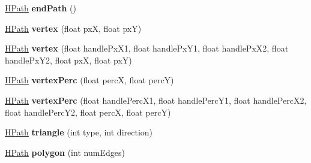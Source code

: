 \begin{DoxyCompactItemize}
\item 
\hypertarget{classhype_1_1extended_1_1drawable_1_1_h_path_a7fab443b9c46241fe59fd7e2756b6bef}{\hyperlink{classhype_1_1extended_1_1drawable_1_1_h_path}{H\-Path} {\bfseries end\-Path} ()}\label{classhype_1_1extended_1_1drawable_1_1_h_path_a7fab443b9c46241fe59fd7e2756b6bef}

\item 
\hypertarget{classhype_1_1extended_1_1drawable_1_1_h_path_a25cb235757061c042c76302750f28069}{\hyperlink{classhype_1_1extended_1_1drawable_1_1_h_path}{H\-Path} {\bfseries vertex} (float px\-X, float px\-Y)}\label{classhype_1_1extended_1_1drawable_1_1_h_path_a25cb235757061c042c76302750f28069}

\item 
\hypertarget{classhype_1_1extended_1_1drawable_1_1_h_path_a72722cff07e11694db24a8d602b2bd5a}{\hyperlink{classhype_1_1extended_1_1drawable_1_1_h_path}{H\-Path} {\bfseries vertex} (float handle\-Px\-X1, float handle\-Px\-Y1, float handle\-Px\-X2, float handle\-Px\-Y2, float px\-X, float px\-Y)}\label{classhype_1_1extended_1_1drawable_1_1_h_path_a72722cff07e11694db24a8d602b2bd5a}

\item 
\hypertarget{classhype_1_1extended_1_1drawable_1_1_h_path_a2713d0a82a5371dfdd7cd68deded2d4d}{\hyperlink{classhype_1_1extended_1_1drawable_1_1_h_path}{H\-Path} {\bfseries vertex\-Perc} (float perc\-X, float perc\-Y)}\label{classhype_1_1extended_1_1drawable_1_1_h_path_a2713d0a82a5371dfdd7cd68deded2d4d}

\item 
\hypertarget{classhype_1_1extended_1_1drawable_1_1_h_path_a447ed5c706af7afb8f23bd2ad5ead052}{\hyperlink{classhype_1_1extended_1_1drawable_1_1_h_path}{H\-Path} {\bfseries vertex\-Perc} (float handle\-Perc\-X1, float handle\-Perc\-Y1, float handle\-Perc\-X2, float handle\-Perc\-Y2, float perc\-X, float perc\-Y)}\label{classhype_1_1extended_1_1drawable_1_1_h_path_a447ed5c706af7afb8f23bd2ad5ead052}

\item 
\hypertarget{classhype_1_1extended_1_1drawable_1_1_h_path_a87e7c3945efc9a04cf90659ec799e596}{\hyperlink{classhype_1_1extended_1_1drawable_1_1_h_path}{H\-Path} {\bfseries triangle} (int type, int direction)}\label{classhype_1_1extended_1_1drawable_1_1_h_path_a87e7c3945efc9a04cf90659ec799e596}

\item 
\hypertarget{classhype_1_1extended_1_1drawable_1_1_h_path_a3c64538392986dd0608b4b06f18fc1cb}{\hyperlink{classhype_1_1extended_1_1drawable_1_1_h_path}{H\-Path} {\bfseries polygon} (int num\-Edges)}\label{classhype_1_1extended_1_1drawable_1_1_h_path_a3c64538392986dd0608b4b06f18fc1cb}


\end{DoxyCompactItemize}
